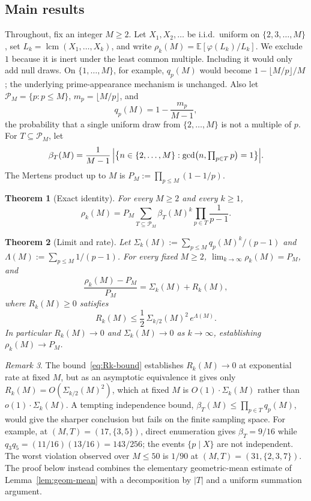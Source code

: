 \documentclass[11pt]{article}
\newtheorem{theorem}{Theorem}
\theoremstyle{remark}
\newtheorem{remark}[theorem]{Remark}
\newcommand{\lcm}{\operatorname{lcm}}
\newcommand{\gcdop}{\operatorname{gcd}}
\newcommand{\EE}{\mathbb{E}}
\newcommand{\PM}{\mathcal{P}_M}
\begin{document}
\subsection{Main results}
Throughout, fix an integer $M \geq 2$. Let $X_1, X_2, \ldots$ be i.i.d.\ uniform on $\{2, 3, \ldots, M\}$, set $L_k = \lcm(X_1, \ldots, X_k)$, and write $\rho_k(M) = \EE[\varphi(L_k)/L_k]$. We exclude $1$ because it is inert under the least common multiple. Including it would only add null draws. On $\{1,\ldots,M\}$, for example, $q_p(M)$ would become $1-\lfloor M/p\rfloor/M$; the underlying prime-appearance mechanism is unchanged. Also let $\PM = \{p : p \leq M\}$, $m_p = \lfloor M/p \rfloor$, and
\[
q_p(M) = 1 - \frac{m_p}{M-1},
\]
the probability that a single uniform draw from $\{2, \ldots, M\}$ is not a multiple of $p$. For $T \subseteq \PM$, let
\[
\beta_T(M) = \frac{1}{M-1}\,\Bigl|\bigl\{n \in \{2, \ldots, M\} : \gcdop\bigl(n, \textstyle\prod_{p \in T} p\bigr) = 1\bigr\}\Bigr|.
\]
The Mertens product up to $M$ is $P_M := \prod_{p \leq M}(1 - 1/p)$.

\begin{theorem}[Exact identity]\label{thm:identity}
For every $M \geq 2$ and every $k \geq 1$,
\begin{equation}\label{eq:identity}
\rho_k(M) = P_M \sum_{T \subseteq \PM} \beta_T(M)^k \prod_{p \in T} \frac{1}{p-1}.
\end{equation}
\end{theorem}

\begin{theorem}[Limit and rate]\label{thm:limit-rate}
Let $\Sigma_k(M) := \sum_{p \leq M} q_p(M)^k/(p-1)$ and $\Lambda(M) := \sum_{p \leq M} 1/(p-1)$. For every fixed $M \geq 2$, $\lim_{k \to \infty} \rho_k(M) = P_M$, and
\begin{equation}\label{eq:decomp}
\frac{\rho_k(M) - P_M}{P_M} = \Sigma_k(M) + R_k(M),
\end{equation}
where $R_k(M) \geq 0$ satisfies
\begin{equation}\label{eq:Rk-bound}
R_k(M) \leq \frac{1}{2}\,\Sigma_{k/2}(M)^2 \, e^{\Lambda(M)}.
\end{equation}
In particular $R_k(M) \to 0$ and $\Sigma_k(M) \to 0$ as $k \to \infty$, establishing $\rho_k(M) \to P_M$.
\end{theorem}

\begin{remark}\label{rem:sharp-fixed-M}
The bound~\eqref{eq:Rk-bound} establishes $R_k(M) \to 0$ at exponential rate at fixed $M$, but as an asymptotic equivalence it gives only $R_k(M) = O(\Sigma_{k/2}(M)^2)$, which at fixed $M$ is $O(1) \cdot \Sigma_k(M)$ rather than $o(1)\cdot \Sigma_k(M)$. A tempting independence bound, $\beta_T(M) \leq \prod_{p \in T} q_p(M)$, would give the sharper conclusion but fails on the finite sampling space. For example, at $(M,T)=(17,\{3,5\})$, direct enumeration gives $\beta_T=9/16$ while $q_3q_5=(11/16)(13/16)=143/256$; the events $\{p\mid X\}$ are not independent. The worst violation observed over $M\leq 50$ is $1/90$ at $(M,T)=(31,\{2,3,7\})$. The proof below instead combines the elementary geometric-mean estimate of Lemma~\ref{lem:geom-mean} with a decomposition by $|T|$ and a uniform summation argument.
\end{remark}
\end{document}
